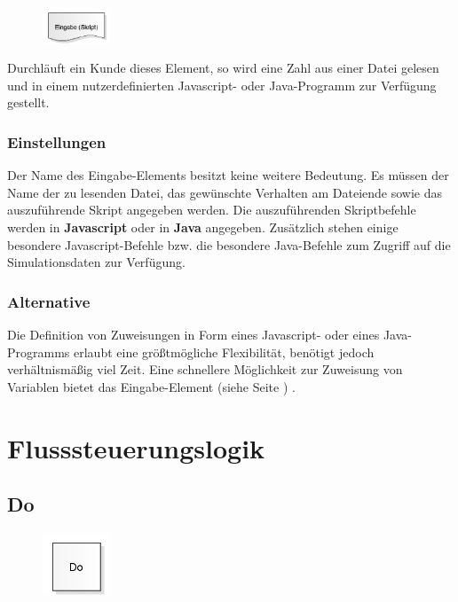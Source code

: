 \begin{figure}
\vspace{-22pt}
\includegraphics[width=2cm]{imageModelElementInputJS.png}
\vspace{-22pt}
\end{figure}

Durchläuft ein Kunde dieses Element, so wird eine Zahl aus einer Datei gelesen und in
einem nutzerdefinierten Javascript- oder Java-Programm zur Verfügung gestellt. 

\subsection*{Einstellungen}

Der Name des Eingabe-Elements besitzt keine weitere Bedeutung. Es müssen der Name der zu lesenden
Datei, das gewünschte Verhalten am Dateiende sowie das auszuführende Skript angegeben werden.
Die auszuführenden Skriptbefehle werden in \textbf{Javascript} oder in \textbf{Java} angegeben.
Zusätzlich stehen einige besondere Javascript-Befehle bzw.
die besondere Java-Befehle 
zum Zugriff auf die Simulationsdaten zur Verfügung.

\subsection*{Alternative}

Die Definition von Zuweisungen in Form eines Javascript- oder eines Java-Programms erlaubt eine größtmögliche Flexibilität,
benötigt jedoch verhältnismäßig viel Zeit. Eine schnellere Möglichkeit zur Zuweisung von Variablen
bietet das Eingabe-Element (siehe Seite \pageref{ref:ModelElementInput}) .





\chapter{Flusssteuerungslogik}

\section{Do}
\label{ref:ModelElementLogicDo}

\begin{figure}
\vspace{-22pt}
\includegraphics[width=2cm]{imageModelElementLogicDo.png}
\vspace{-22pt}
\end{figure}


